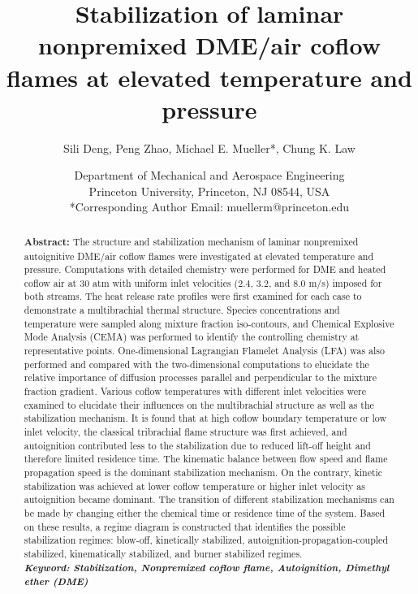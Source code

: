 \documentclass{wssci}
\begin{document}
\title{Stabilization of laminar nonpremixed DME/air coflow flames at elevated temperature and pressure}

\author{
%
Sili Deng, Peng Zhao, Michael E. Mueller*, Chung K. Law 
%
}
\date{
Department of Mechanical and Aerospace Engineering\\
Princeton University, Princeton, NJ 08544, USA\\
*Corresponding Author Email: muellerm@princeton.edu
%
}

\maketitle
\thispagestyle{fancyplain}

\begin{abstract}
\textbf{Abstract:} The structure and stabilization mechanism of laminar nonpremixed autoignitive DME/air coflow flames were investigated at elevated temperature and pressure. Computations with detailed chemistry were performed for DME and heated coflow air at $30$ atm with uniform inlet velocities ($2.4$, $3.2$, and $8.0$ m/s) imposed for both streams.  The heat release rate profiles were first examined for each case to demonstrate a multibrachial thermal structure.  Species concentrations and temperature were sampled along mixture fraction iso-contours, and Chemical Explosive Mode Analysis (CEMA) was performed to identify the controlling chemistry at representative points.  One-dimensional Lagrangian Flamelet Analysis (LFA) was also performed and compared with the two-dimensional computations to elucidate the relative importance of diffusion processes parallel and perpendicular to the mixture fraction gradient.  Various coflow temperatures with different inlet velocities were examined to elucidate their influences on the multibrachial structure as well as the stabilization mechanism.  It is found that at high coflow boundary temperature or low inlet velocity, the classical tribrachial flame structure was first achieved, and autoignition contributed less to the stabilization due to reduced lift-off height and therefore limited residence time.  The kinematic balance between flow speed and flame propagation speed is the dominant stabilization mechanism.  On the contrary, kinetic stabilization was achieved at lower coflow temperature or higher inlet velocity as autoignition became dominant.  The transition of different stabilization mechanisms can be made by changing either the chemical time or residence time of the system.  Based on these results, a regime diagram is constructed that identifies the possible stabilization regimes: blow-off, kinetically stabilized, autoignition-propagation-coupled stabilized, kinematically stabilized, and burner stabilized regimes.\\
\textbf{\textit{Keyword: Stabilization, Nonpremixed coflow flame, Autoignition, Dimethyl ether (DME)}}
\end{abstract}
\end{document}
